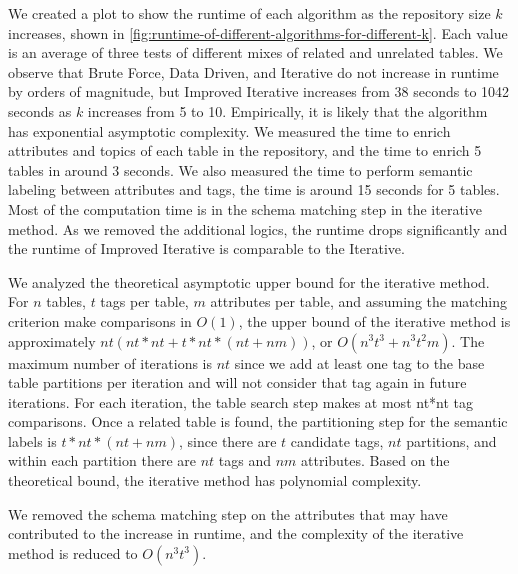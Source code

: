 We created a plot to show the runtime of each algorithm as the repository size $k$ increases, shown in \autoref{fig:runtime-of-different-algorithms-for-different-k}. Each value is an average of three tests of different mixes of related and unrelated tables. We observe that Brute Force, Data Driven, and Iterative do not increase in runtime by orders of magnitude, but Improved Iterative increases from 38 seconds to 1042 seconds as $k$ increases from 5 to 10. Empirically, it is likely that the algorithm has exponential asymptotic complexity. We measured the time to enrich attributes and topics of each table in the repository, and the time to enrich 5 tables in around 3 seconds. We also measured the time to perform semantic labeling between attributes and tags, the time is around 15 seconds for 5 tables. Most of the computation time is in the schema matching step in the iterative method. As we removed the additional logics, the runtime drops significantly and the runtime of Improved Iterative is comparable to the Iterative.

We analyzed the theoretical asymptotic upper bound for the iterative method. For $n$ tables, $t$ tags per table, $m$ attributes per table, and assuming the matching criterion make comparisons in $O(1)$, the upper bound of the iterative method is approximately $nt(nt*nt+t*nt*(nt+nm))$, or $O(n^3t^3+n^3t^2m)$. The maximum number of iterations is $nt$ since we add at least one tag to the base table partitions per iteration and will not consider that tag again in future iterations. For each iteration, the table search step makes at most nt{*}nt tag comparisons. Once a related table is found, the partitioning step for the semantic labels is $t*nt*(nt+nm)$, since there are $t$ candidate tags, $nt$ partitions, and within each partition there are $nt$ tags and $nm$ attributes. Based on the theoretical bound, the iterative method has polynomial complexity.

We removed the schema matching step on the attributes that may have contributed to the increase in runtime, and the complexity of the iterative method is reduced to $O(n^3t^3)$.
\endinput